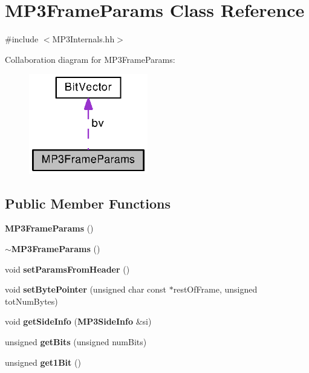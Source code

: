 \section{M\+P3\+Frame\+Params Class Reference}
\label{classMP3FrameParams}


{\ttfamily \#include $<$M\+P3\+Internals.\+hh$>$}



Collaboration diagram for M\+P3\+Frame\+Params\+:
\nopagebreak
\begin{figure}[H]
\begin{center}
\leavevmode
\includegraphics[width=147pt]{classMP3FrameParams__coll__graph}
\end{center}
\end{figure}
\subsection*{Public Member Functions}
\begin{DoxyCompactItemize}
\item 
{\bf M\+P3\+Frame\+Params} ()
\item 
{\bf $\sim$\+M\+P3\+Frame\+Params} ()
\item 
void {\bf set\+Params\+From\+Header} ()
\item 
void {\bf set\+Byte\+Pointer} (unsigned char const $\ast$rest\+Of\+Frame, unsigned tot\+Num\+Bytes)
\item 
void {\bf get\+Side\+Info} ({\bf M\+P3\+Side\+Info} \&si)
\item 
unsigned {\bf get\+Bits} (unsigned num\+Bits)
\item 
unsigned {\bf get1\+Bit} ()
\end{DoxyCompactItemize}
